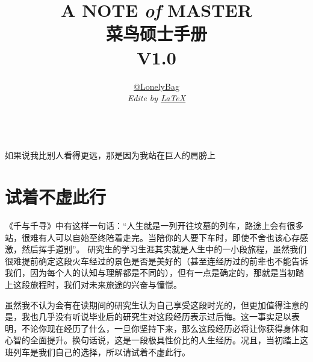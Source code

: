 \documentclass[UTF8,oneside]{ctexbook}
\title{\Huge{A NOTE {\itshape of} MASTER}\\
\Huge{菜鸟硕士手册}\\
\large{V1.0}}
\author{\href{https://github.com/lonelybag?tab=repositories}{\Large{@LonelyBag}}\\ {\itshape \large{Edite by \href{https://mirrors.tuna.tsinghua.edu.cn/CTAN/systems/texlive/Images/}{\LaTeX}}}}
\begin{document}
\frontmatter
\maketitle


\begin{center}  %
	\quad \\
	\vspace{5cm}
	\LARGE{如果说我比别人看得更远，那是因为我站在巨人的肩膀上}\\
\end{center}
\thispagestyle{empty}
\tableofcontents

\mainmatter
\chapter{试着不虚此行}
《千与千寻》中有这样一句话：“人生就是一列开往坟墓的列车，路途上会有很多站，很难有人可以自始至终陪着走完。当陪你的人要下车时，即使不舍也该心存感激，然后挥手道别”。
研究生的学习生涯其实就是人生中的一小段旅程，虽然我们很难提前确定这段火车经过的景色是否是美好的（甚至连经历过的前辈也不能告诉我们，因为每个人的认知与理解都是不同的），但有一点是确定的，那就是当初踏上这段旅程时，我们对未来旅途的兴奋与憧憬。

虽然我不认为会有在读期间的研究生认为自己享受这段时光的，但更加值得注意的是，我也几乎没有听说毕业后的研究生对这段经历表示过后悔。这一事实足以表明，不论你现在经历了什么，一旦你坚持下来，那么这段经历必将让你获得身体和心智的全面提升。换句话说，这是一段极具性价比的人生经历。况且，当初踏上这班列车是我们自己的选择，所以请试着不虚此行。
\end{document}
